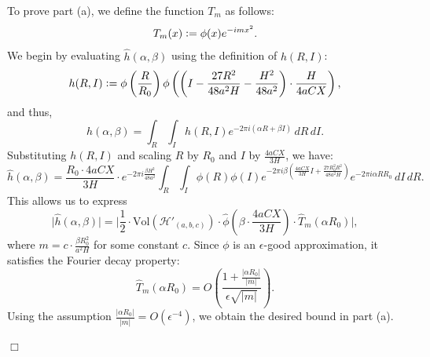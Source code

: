 \documentclass{article}
\def\H{{\mathcal H}}
\def\H{{\mathcal H}}
\newenvironment{proof}{\noindent {\bf Proof:}}{$\Box$ \vspace{2 ex}}
\begin{document}
\begin{proof}
To prove part (a), we define the function $T_m$ as follows:
\begin{equation*}
T_m(x) \vcentcolon= \phi(x)e^{-imx^2}.
\end{equation*}
We begin by evaluating $\widehat{h}(\alpha, \beta)$ using the definition of $h(R, I)$:
\begin{equation*}
h(R, I) \vcentcolon= \phi\left(\frac{R}{R_0}\right) \phi\left(\left(I - \frac{27R^2}{48a^2H} - \frac{H^2}{48a^2}\right) \cdot \frac{H}{4aCX}\right),
\end{equation*}
and thus,
\begin{equation*}
\widehat{h}(\alpha, \beta) = \int_{R} \int_{I} h(R, I) e^{-2\pi i (\alpha R + \beta I)} \, dR \, dI.
\end{equation*}
Substituting $h(R, I)$ and scaling $R$ by $R_0$ and $I$ by $\frac{4aCX}{3H}$, we have:
\begin{equation*}
\widehat{h}(\alpha, \beta) = \frac{R_0 \cdot 4aCX}{3H} \cdot e^{-2\pi i \frac{\beta H^2}{48a^2}}\int_{R}\int_{I} \phi(R) \phi(I) e^{-2\pi i \beta \left(\frac{4aCX}{3H} I + \frac{27R_0^2 R^2}{48a^2H}\right)} e^{-2\pi i \alpha R R_0} \, dI \, dR.
\end{equation*}
This allows us to express
\begin{equation*}
\Big|\widehat{h}(\alpha, \beta)\Big| = \Big|\frac{1}{2} \cdot \text{Vol}(\H'_{(a, b, c)}) \cdot \widehat{\phi}\left(\beta \cdot \frac{4aCX}{3H}\right) \cdot \widehat{T}_m(\alpha R_0) \Big|,
\end{equation*}
where $m = c \cdot \frac{\beta R_0^2}{a^2 H}$ for some constant $c$. Since $\phi$ is an $\epsilon$-good approximation, it satisfies the Fourier decay property:
\begin{equation*}
\widehat{T}_m(\alpha R_0) = O\left(\frac{1 + \frac{|\alpha R_0|}{|m|}}{\epsilon\sqrt{|m|}}\right).
\end{equation*}
Using the assumption $\frac{|\alpha R_0|}{|m|} = O(\epsilon^{-4})$, we obtain the desired bound in part (a).


\end{proof}
\end{document}
